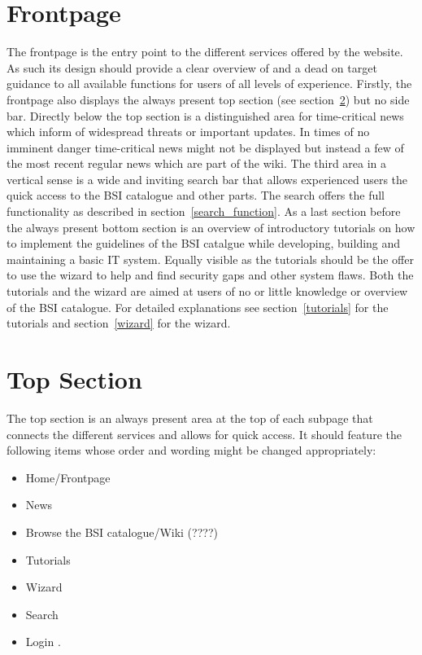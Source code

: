 \section{Frontpage}
The frontpage is the entry point to the different services offered by the website. 
As such its design should provide a clear overview of and a dead on target guidance to all available functions for users of all levels of experience.
Firstly, the frontpage also displays the always present top section (see section~\ref{top_section}) but no side bar.
Directly below the top section is a distinguished area for time-critical news which inform of widespread threats or important updates.
In times of no imminent danger time-critical news might not be displayed but instead a few of the most recent regular news which are part of the wiki.
The third area in a vertical sense is a wide and inviting search bar that allows experienced users the quick access to the BSI catalogue and other parts. 
The search offers the full functionality as described in section~\ref{search_function}.
As a last section before the always present bottom section is an overview of introductory tutorials on how to implement the guidelines of the BSI catalgue while developing, building and maintaining a basic IT system.
Equally visible as the tutorials should be the offer to use the wizard to help and find security gaps and other system flaws.
Both the tutorials and the wizard are aimed at users of no or little knowledge or overview of the BSI catalogue.
For detailed explanations see section~\ref{tutorials} for the tutorials and section~\ref{wizard} for the wizard.
 
\section{Top Section}
\label{top_section}

The top section is an always present area at the top of each subpage that connects the different services and allows for quick access.
It should feature the following items whose order and wording might be changed appropriately:
\begin{itemize}
    \item Home/Frontpage
    \item News
    \item Browse the BSI catalogue/Wiki (????)
    \item Tutorials
    \item Wizard
    \item Search
    \item Login 
        .
\end{itemize}

